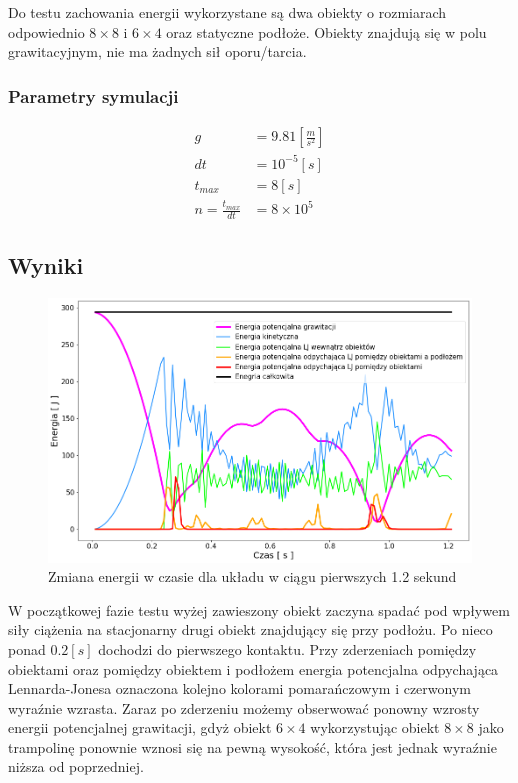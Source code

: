 \documentclass[12pt, letterpaper]{report}
\begin{document}
    Do testu zachowania energii wykorzystane są dwa obiekty o rozmiarach 
    odpowiednio $8 \times 8$ i $6 \times 4$ oraz statyczne podłoże. Obiekty
    znajdują się w polu grawitacyjnym, nie ma żadnych sił oporu/tarcia.

    \subsubsection{Parametry symulacji}
    \begin{align*}
        g &= 9.81 [\frac{m}{s^2}] \\
        dt &= 10^{-5} [s] \\
        t_{max} &= 8 [s] \\
        n = \frac{t_{max}}{dt} &= 8 \times 10^{5}
    \end{align*}

    \subsection{Wyniki}
    \begin{figure}[H]
        \centering
        \includegraphics[width=14cm]{energy_test_0to2s}
        \caption{Zmiana energii w czasie dla układu w ciągu pierwszych 1.2 sekund}
    \end{figure}


    W początkowej fazie testu wyżej zawieszony obiekt zaczyna spadać
    pod wpływem siły ciążenia na stacjonarny drugi obiekt znajdujący
    się przy podłożu. Po nieco ponad $0.2 [s]$ dochodzi do pierwszego kontaktu.
    Przy zderzeniach pomiędzy obiektami oraz pomiędzy obiektem i podłożem energia potencjalna
    odpychająca Lennarda-Jonesa oznaczona kolejno kolorami pomarańczowym i czerwonym
    wyraźnie wzrasta. Zaraz po zderzeniu możemy obserwować ponowny wzrosty energii potencjalnej grawitacji,
    gdyż obiekt $6 \times 4$ wykorzystując obiekt $8 \times 8$ jako trampolinę ponownie wznosi się na 
    pewną wysokość, która jest jednak wyraźnie niższa od poprzedniej.
\end{document}
